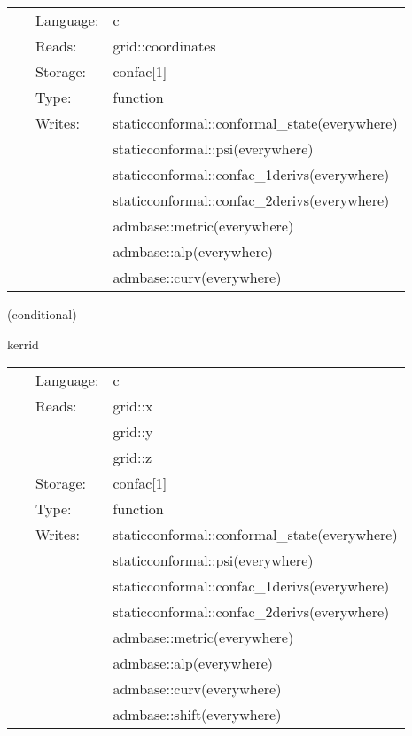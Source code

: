  \begin{tabular*}{160mm}{cll} 
~ & Language:  & c \\ 
~ & Reads:  & grid::coordinates \\ 
~ & Storage:  & confac[1] \\ 
~ & Type:  & function \\ 
~ & Writes:  & staticconformal::conformal\_state(everywhere) \\ 
~& ~ &staticconformal::psi(everywhere)\\ 
~& ~ &staticconformal::confac\_1derivs(everywhere)\\ 
~& ~ &staticconformal::confac\_2derivs(everywhere)\\ 
~& ~ &admbase::metric(everywhere)\\ 
~& ~ &admbase::alp(everywhere)\\ 
~& ~ &admbase::curv(everywhere)\\ 
\end{tabular*} 


\vspace{5mm}

   (conditional) 

\hspace{5mm} kerrid 

\hspace{5mm}{\it construct initial data for a single kerr black hole } 


\hspace{5mm}

 \begin{tabular*}{160mm}{cll} 
~ & Language:  & c \\ 
~ & Reads:  & grid::x \\ 
~& ~ &grid::y\\ 
~& ~ &grid::z\\ 
~ & Storage:  & confac[1] \\ 
~ & Type:  & function \\ 
~ & Writes:  & staticconformal::conformal\_state(everywhere) \\ 
~& ~ &staticconformal::psi(everywhere)\\ 
~& ~ &staticconformal::confac\_1derivs(everywhere)\\ 
~& ~ &staticconformal::confac\_2derivs(everywhere)\\ 
~& ~ &admbase::metric(everywhere)\\ 
~& ~ &admbase::alp(everywhere)\\ 
~& ~ &admbase::curv(everywhere)\\ 
~& ~ &admbase::shift(everywhere)\\ 
\end{tabular*} 


